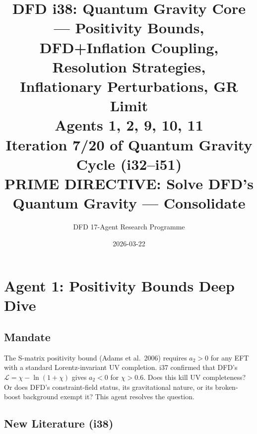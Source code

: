 \documentclass[11pt,a4paper]{article}
\title{DFD i38: Quantum Gravity Core --- Positivity Bounds,\\DFD+Inflation Coupling, Resolution Strategies,\\Inflationary Perturbations, GR Limit\\[6pt]
\large Agents 1, 2, 9, 10, 11\\[6pt]
\normalsize Iteration 7/20 of Quantum Gravity Cycle (i32--i51)\\
PRIME DIRECTIVE: Solve DFD's Quantum Gravity --- Consolidate}
\author{DFD 17-Agent Research Programme}
\date{2026-03-22}
\begin{document}
\maketitle
\tableofcontents
\newpage

\section{Agent 1: Positivity Bounds Deep Dive}
\label{sec:agent1}

\subsection{Mandate}

The S-matrix positivity bound (Adams et al.\ 2006) requires $a_2 > 0$ for any EFT with a standard Lorentz-invariant UV completion. i37 confirmed that DFD's $\mathcal{L} = \chi - \ln(1+\chi)$ gives $a_2 < 0$ for $\chi > 0.6$. Does this kill UV completeness? Or does DFD's constraint-field status, its gravitational nature, or its broken-boost background exempt it? This agent resolves the question.

\subsection{New Literature (i38)}
\end{document}
